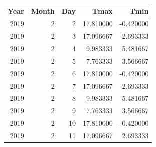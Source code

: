 \documentclass[
]{book}
\begin{document}
\begin{tabular}{r|r|r|r|r}
\hline
Year & Month & Day & Tmax & Tmin\\
\hline
2019 & 2 & 2 & 17.810000 & -0.420000\\
\hline
2019 & 2 & 3 & 17.096667 & 2.693333\\
\hline
2019 & 2 & 4 & 9.983333 & 5.481667\\
\hline
2019 & 2 & 5 & 7.763333 & 3.566667\\
\hline
2019 & 2 & 6 & 17.810000 & -0.420000\\
\hline
2019 & 2 & 7 & 17.096667 & 2.693333\\
\hline
2019 & 2 & 8 & 9.983333 & 5.481667\\
\hline
2019 & 2 & 9 & 7.763333 & 3.566667\\
\hline
2019 & 2 & 10 & 17.810000 & -0.420000\\
\hline
2019 & 2 & 11 & 17.096667 & 2.693333\\
\hline
\end{tabular}
\endgroup{}

  
\end{document}
